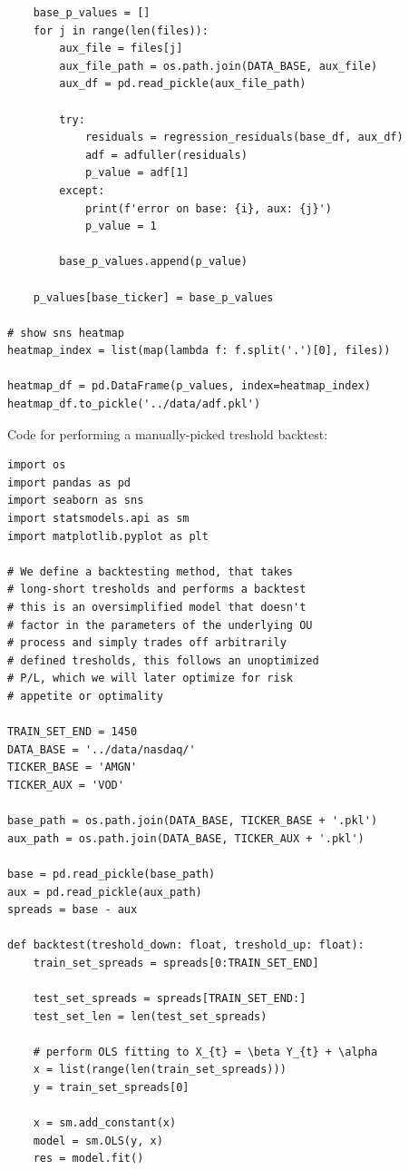 \documentclass{article}
\begin{document}
\begin{spacing}{2.0}
\begin{lstlisting}
    base_p_values = []
    for j in range(len(files)):
        aux_file = files[j]
        aux_file_path = os.path.join(DATA_BASE, aux_file)
        aux_df = pd.read_pickle(aux_file_path)

        try:
            residuals = regression_residuals(base_df, aux_df)
            adf = adfuller(residuals)
            p_value = adf[1]
        except:
            print(f'error on base: {i}, aux: {j}')
            p_value = 1

        base_p_values.append(p_value)

    p_values[base_ticker] = base_p_values

# show sns heatmap
heatmap_index = list(map(lambda f: f.split('.')[0], files))

heatmap_df = pd.DataFrame(p_values, index=heatmap_index)
heatmap_df.to_pickle('../data/adf.pkl')
\end{lstlisting}

Code for performing a manually-picked treshold backtest:

\begin{lstlisting}
import os
import pandas as pd
import seaborn as sns
import statsmodels.api as sm
import matplotlib.pyplot as plt

# We define a backtesting method, that takes
# long-short tresholds and performs a backtest
# this is an oversimplified model that doesn't
# factor in the parameters of the underlying OU
# process and simply trades off arbitrarily
# defined tresholds, this follows an unoptimized
# P/L, which we will later optimize for risk
# appetite or optimality

TRAIN_SET_END = 1450
DATA_BASE = '../data/nasdaq/'
TICKER_BASE = 'AMGN'
TICKER_AUX = 'VOD'

base_path = os.path.join(DATA_BASE, TICKER_BASE + '.pkl')
aux_path = os.path.join(DATA_BASE, TICKER_AUX + '.pkl')

base = pd.read_pickle(base_path)
aux = pd.read_pickle(aux_path)
spreads = base - aux

def backtest(treshold_down: float, treshold_up: float):
    train_set_spreads = spreads[0:TRAIN_SET_END]

    test_set_spreads = spreads[TRAIN_SET_END:]
    test_set_len = len(test_set_spreads)

    # perform OLS fitting to X_{t} = \beta Y_{t} + \alpha
    x = list(range(len(train_set_spreads)))
    y = train_set_spreads[0]

    x = sm.add_constant(x)
    model = sm.OLS(y, x)
    res = model.fit()


\end{lstlisting}
\end{spacing}
\end{document}
